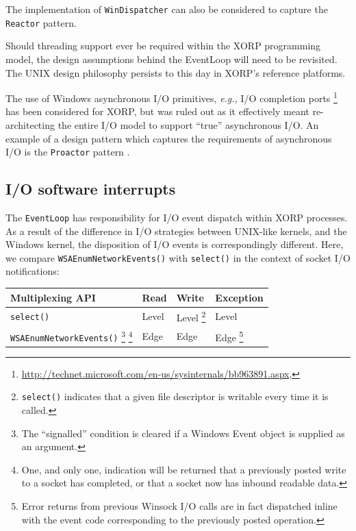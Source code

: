 \documentclass[11pt]{article}
\newcommand{\eg}{\emph{e.g.,}\xspace}
\begin{document}
The implementation of {\tt WinDispatcher} can also be considered to capture
the {\tt Reactor} pattern.

Should threading support ever be required within the XORP programming model,
the design assumptions behind the EventLoop will need to be revisited.
The UNIX design philosophy persists to this day in XORP's reference
platforms.

The use of Windows asynchronous I/O primitives, \eg I/O completion ports
\footnote{\url{http://technet.microsoft.com/en-us/sysinternals/bb963891.aspx},}
has been considered for XORP, but was ruled out as it effectively meant
re-architecting the entire I/O model to support ``true'' asynchronous I/O.
An example of a design pattern which captures the requirements
of asynchronous I/O is the {\tt Proactor} pattern \cite{schmidt:coplien_pattern_1995}.

\subsection{I/O software interrupts}

The {\tt EventLoop} has responsibility for I/O event dispatch within XORP processes.
As a result of the difference in I/O strategies between UNIX-like kernels, and the
Windows kernel, the disposition of I/O events is correspondingly different.
Here, we compare {\tt WSAEnumNetworkEvents()} with
{\tt select()} in the context of socket I/O notifications:

\begin{center}
\begin{minipage}[0]{12cm}
\begin{tabular}{ | l | l | l | l | }
\hline

Multiplexing API & Read & Write & Exception \\ \hline\hline

{\tt select()} &
Level &
Level
\footnote{{\tt select()} indicates that a given file descriptor is writable
every time it is called.} &
Level \\

{\tt WSAEnumNetworkEvents()}
\footnote{The ``signalled'' condition is cleared if a Windows Event object is supplied as an argument.}
\footnote{One, and only one, indication will be returned that a previously posted write to a socket has completed,
or that a socket now has inbound readable data.}
&
Edge
&
Edge
&
Edge
\footnote{Error returns from previous Winsock I/O calls are in fact
dispatched inline with the event code corresponding to the
previously posted operation.} \\ \hline
\end{tabular} 
\end{minipage}
\end{center}
\end{document}
